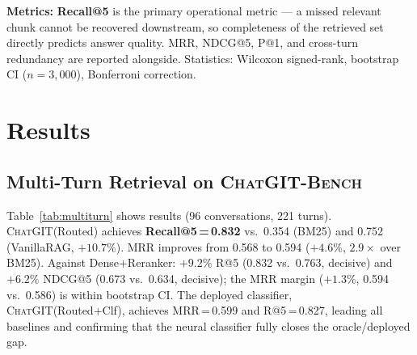 \documentclass[runningheads]{llncs}
\newcommand{\chatgit}{\textsc{ChatGIT}\xspace}
\newcommand{\conv}{\textsc{ChatGIT-Bench}\xspace}
\begin{document}
\textbf{Metrics:} \textbf{Recall@5} is the primary operational metric ---
a missed relevant chunk cannot be recovered downstream, so completeness of
the retrieved set directly predicts answer quality. MRR, NDCG@5, P@1, and
cross-turn redundancy are reported alongside. Statistics: Wilcoxon
signed-rank, bootstrap CI ($n{=}3{,}000$), Bonferroni correction.

\FloatBarrier
\section{Results}
\label{sec:results}

\subsection{Multi-Turn Retrieval on \conv}

Table~\ref{tab:multiturn} shows results (96 conversations, 221 turns).
\chatgit (Routed) achieves \textbf{Recall@5\,=\,0.832} vs.\ 0.354 (BM25)
and 0.752 (VanillaRAG, $+10.7\%$). MRR improves from 0.568 to 0.594
($+4.6\%$, $2.9\times$ over BM25). Against Dense+Reranker: $+9.2\%$ R@5
(0.832 vs.\ 0.763, decisive) and $+6.2\%$ NDCG@5 (0.673 vs.\ 0.634,
decisive); the MRR margin ($+1.3\%$, 0.594 vs.\ 0.586) is within
bootstrap CI. The deployed classifier, \chatgit (Routed+Clf),
achieves MRR\,=\,0.599 and R@5\,=\,0.827, leading all baselines
and confirming that the neural classifier fully closes the oracle/deployed gap.
\end{document}
